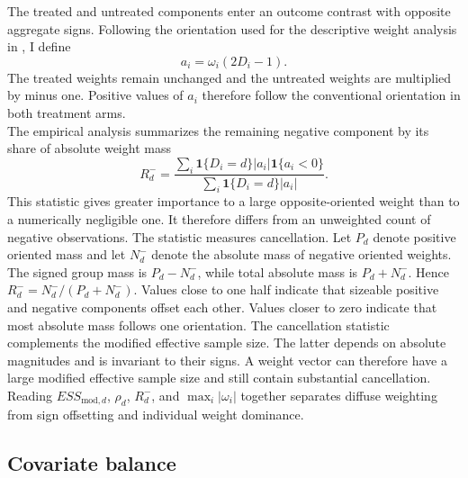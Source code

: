 \documentclass[12pt, a4paper, oneside]{article}
\theoremstyle{plain}
\theoremstyle{definition}
\begin{document}
The treated and untreated components enter an outcome contrast with opposite aggregate
signs. Following the orientation used for the descriptive weight analysis in
\citet[Section~5]{knaus2024treatment}, I define
\begin{equation}
    a_i=\omega_i(2D_i-1).
    \label{eq:balance_oriented_weights}
\end{equation}
The treated weights remain unchanged and the untreated weights are multiplied by
minus one. Positive values of \(a_i\) therefore follow the conventional orientation
in both treatment arms.\\
The empirical analysis summarizes the remaining negative component by its share of
absolute weight mass
\begin{equation}
    R_d^{-}
    =
    \frac{
      \sum_i\mathbf 1\{D_i=d\}|a_i|\mathbf 1\{a_i<0\}
    }{
      \sum_i\mathbf 1\{D_i=d\}|a_i|
    }.
    \label{eq:opposite_sign_mass}
\end{equation}
This statistic gives greater importance to a large opposite-oriented weight than to a
numerically negligible one. It therefore differs from an unweighted count of negative
observations.
The statistic measures cancellation. Let \(P_d\) denote positive oriented mass and
let \(N_d^{-}\) denote the absolute mass of negative oriented weights. The signed
group mass is \(P_d-N_d^{-}\), while total absolute mass is \(P_d+N_d^{-}\). Hence
\(R_d^{-}=N_d^{-}/(P_d+N_d^{-})\). Values close to one half indicate that sizeable
positive and negative components offset each other. Values closer to zero indicate
that most absolute mass follows one orientation. 
The cancellation statistic complements the modified effective sample size. The latter
depends on absolute magnitudes and is invariant to their signs. A weight vector can
therefore have a large modified effective sample size and still contain substantial
cancellation. Reading \(ESS_{\mathrm{mod},d}\), \(\rho_d\), \(R_d^{-}\), and
\(\max_i|\omega_i|\) together separates diffuse weighting from sign offsetting and
individual weight dominance.














\subsection{Covariate balance}
\label{subsec:covariate_balance}
\end{document}
